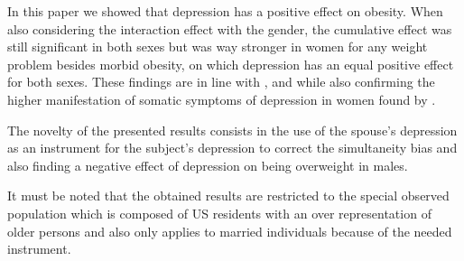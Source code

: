 In this paper we showed that depression has a positive effect on obesity. When also considering the interaction effect with the gender, the cumulative effect was still significant in both sexes but was way stronger in women for any weight problem besides morbid obesity, on which depression has an equal positive effect for both sexes. These findings are in line with \cite{markowitz}, \cite{luppino} and \cite{dave} while also confirming the higher manifestation of somatic symptoms of depression in women found by \cite{silver}.

The novelty of the presented results consists in the use of the spouse's depression as an instrument for the subject's depression to correct the simultaneity bias and also finding a negative effect of depression on being overweight in males.

It must be noted that the obtained results are restricted to the special observed population which is composed of US residents with an over representation of older persons and also only applies to married individuals because of the needed instrument.